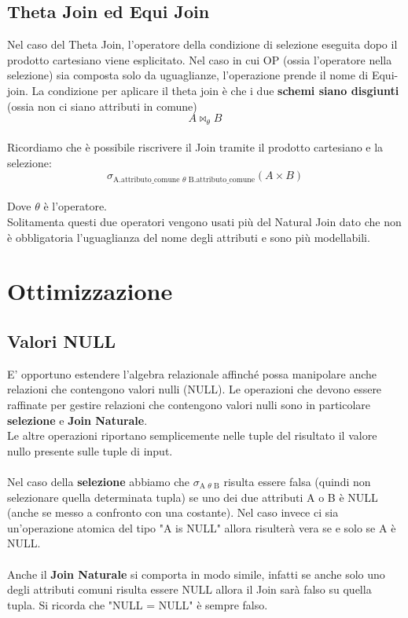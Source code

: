 \documentclass{report}
\begin{document}
\subsection{Theta Join ed Equi Join}
Nel caso del Theta Join, l'operatore della condizione di selezione eseguita dopo il prodotto cartesiano viene esplicitato. Nel caso in cui OP (ossia l'operatore nella selezione) sia composta solo da uguaglianze, l’operazione prende il nome di Equi-join. La condizione per aplicare il theta join è che i due \textbf{schemi siano disgiunti} (ossia non ci siano attributi in comune)\\
$$ A \bowtie_{\text{$\theta$}}B$$\\
Ricordiamo che è possibile riscrivere il Join tramite il prodotto cartesiano e la selezione:\\
$$\sigma_{\text{A.attributo\_comune $\theta$ B.attributo\_comune}}(A \times B)$$\\
Dove $\theta$ è l'operatore.\\
Solitamenta questi due operatori vengono usati più del Natural Join dato che non è obbligatoria l'uguaglianza del nome degli attributi e sono più modellabili.\\

\newpage
\section{Ottimizzazione}
\subsection{Valori NULL}
E’ opportuno estendere l’algebra relazionale affinché possa manipolare anche relazioni che contengono valori nulli (NULL). Le operazioni che devono essere raffinate per gestire relazioni che contengono valori nulli sono in particolare \textbf{selezione} e \textbf{Join Naturale}.\\
Le altre operazioni riportano semplicemente nelle tuple del risultato il valore nullo presente sulle tuple di input.\\\\
Nel caso della \textbf{selezione} abbiamo che $\sigma_\text{A $\theta$ B}$ risulta essere falsa (quindi non selezionare quella determinata tupla) se uno dei due attributi A o B è NULL (anche se messo a confronto con una costante). Nel caso invece ci sia un'operazione atomica del tipo "A is NULL" allora risulterà vera se e solo se A è NULL.\\\\
Anche il \textbf{Join Naturale} si comporta in modo simile, infatti se anche solo uno degli attributi comuni risulta essere NULL allora il Join sarà falso su quella tupla. Si ricorda che "NULL = NULL" è sempre falso.\\
\end{document}
